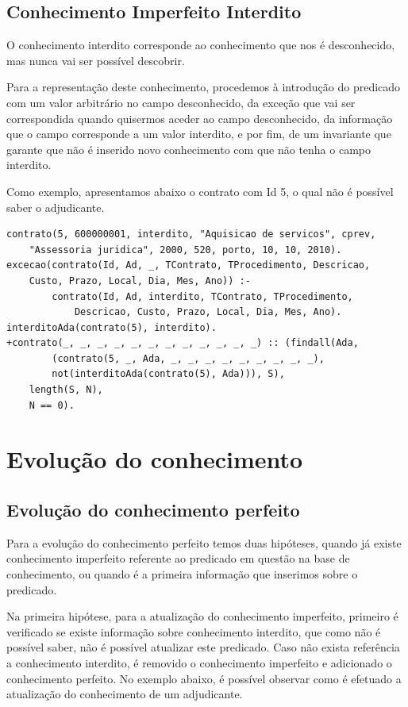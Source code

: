 \documentclass[a4paper]{report}
\begin{document}
\subsection{Conhecimento Imperfeito Interdito}

O conhecimento interdito corresponde ao conhecimento que nos é desconhecido, mas
nunca vai ser possível descobrir.

Para a representação deste conhecimento, procedemos à introdução do predicado
com um valor arbitrário no campo desconhecido, da exceção que vai ser
correspondida quando quisermos aceder ao campo desconhecido, da informação que o
campo corresponde a um valor interdito, e por fim, de um invariante que garante
que não é inserido novo conhecimento com que não tenha o campo interdito.

Como exemplo, apresentamos abaixo o contrato com Id 5, o qual não é possível
saber o adjudicante.

\begin{verbatim}
contrato(5, 600000001, interdito, "Aquisicao de servicos", cprev, 
    "Assessoria juridica", 2000, 520, porto, 10, 10, 2010).
excecao(contrato(Id, Ad, _, TContrato, TProcedimento, Descricao, 
    Custo, Prazo, Local, Dia, Mes, Ano)) :-
        contrato(Id, Ad, interdito, TContrato, TProcedimento, 
            Descricao, Custo, Prazo, Local, Dia, Mes, Ano).
interditoAda(contrato(5), interdito).
+contrato(_, _, _, _, _, _, _, _, _, _, _, _) :: (findall(Ada, 
        (contrato(5, _, Ada, _, _, _, _, _, _, _, _, _),
        not(interditoAda(contrato(5), Ada))), S),
    length(S, N),
    N == 0).
\end{verbatim}

\section{Evolução do conhecimento}

\subsection{Evolução do conhecimento perfeito}

Para a evolução do conhecimento perfeito temos duas hipóteses, quando já existe
conhecimento imperfeito referente ao predicado em questão na base de
conhecimento, ou quando é a primeira informação que inserimos sobre o predicado.

Na primeira hipótese, para a atualização do conhecimento imperfeito, primeiro é
verificado se existe informação sobre conhecimento interdito, que como não é
possível saber, não é possível atualizar este predicado. Caso não exista
referência a conhecimento interdito, é removido o conhecimento imperfeito e
adicionado o conhecimento perfeito. No exemplo abaixo, é possível observar como
é efetuado a atualização do conhecimento de um adjudicante. 
\end{document}
